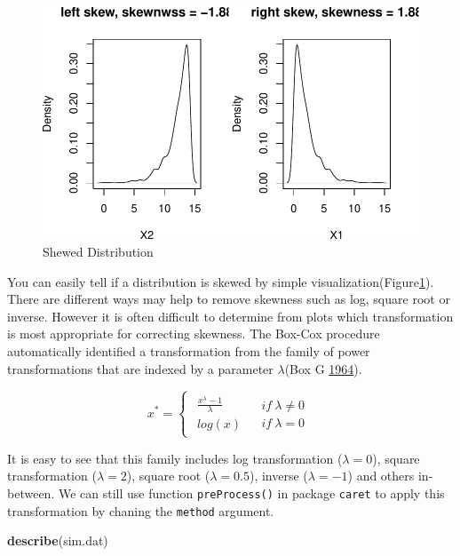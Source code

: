 \documentclass[]{book}
\newenvironment{Shaded}{\begin{snugshade}}{\end{snugshade}}
\newcommand{\KeywordTok}[1]{\textcolor[rgb]{0.13,0.29,0.53}{\textbf{{#1}}}}
\newcommand{\NormalTok}[1]{{#1}}
\theoremstyle{definition}
\theoremstyle{definition}
\theoremstyle{remark}
\begin{document}
\begin{figure}

{\centering \includegraphics[width=0.8\linewidth]{CE_JSM2017_files/figure-latex/skew-1} 

}

\caption{Shewed Distribution}\label{fig:skew}
\end{figure}

You can easily tell if a distribution is skewed by simple
visualization(Figure\ref{fig:skew}). There are different ways may help
to remove skewness such as log, square root or inverse. However it is
often difficult to determine from plots which transformation is most
appropriate for correcting skewness. The Box-Cox procedure automatically
identified a transformation from the family of power transformations
that are indexed by a parameter \(\lambda\)(Box G
\protect\hyperlink{ref-BOXCOX1}{1964}).

\[
x^{*}=\begin{cases}
\begin{array}{c}
\frac{x^{\lambda}-1}{\lambda}\\
log(x)
\end{array} & \begin{array}{c}
if\ \lambda\neq0\\
if\ \lambda=0
\end{array}\end{cases}
\]

It is easy to see that this family includes log transformation
(\(\lambda=0\)), square transformation (\(\lambda=2\)), square root
(\(\lambda=0.5\)), inverse (\(\lambda=-1\)) and others in-between. We
can still use function \texttt{preProcess()} in package \texttt{caret}
to apply this transformation by chaning the \texttt{method} argument.

\begin{Shaded}
\begin{Highlighting}[]
\KeywordTok{describe}\NormalTok{(sim.dat)}
\end{Highlighting}
\end{Shaded}
\end{document}

